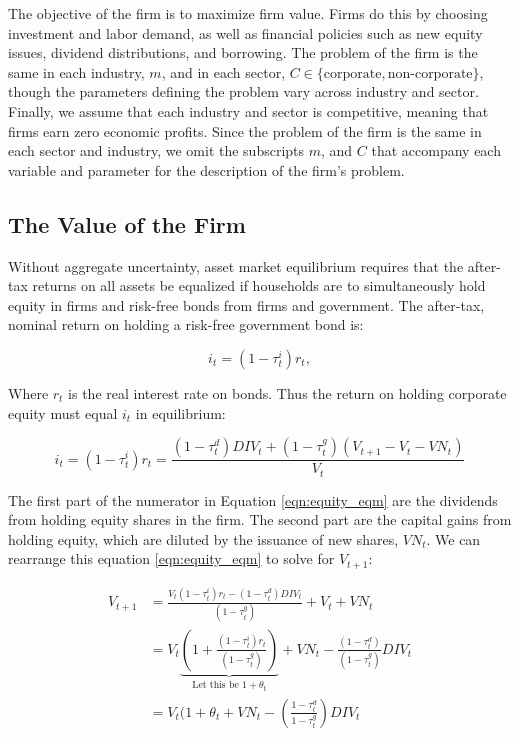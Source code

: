 The objective of the firm is to maximize firm value.  Firms do this by choosing investment and labor demand, as well as financial policies such as new equity issues, dividend distributions, and borrowing.  The problem of the firm is the same in each industry, $m$, and in each sector, $C\in\{\text{corporate},\text{non-corporate}\}$, though the parameters defining the problem vary across industry and sector.  Finally, we assume that each industry and sector is competitive, meaning that firms earn zero economic profits.  Since the problem of the firm is the same in each sector and industry, we omit the subscripts $m$, and $C$ that accompany each variable and parameter for the description of the firm's problem.

\subsection{The Value of the Firm}

Without aggregate uncertainty, asset market equilibrium requires that the after-tax returns on all assets be equalized if households are to simultaneously hold equity in firms and risk-free bonds from firms and government.  The after-tax, nominal return on holding a risk-free government bond is:

\begin{equation}
\label{eqn:r}
i_{t}=(1-\tau^{i}_{t})r_{t},
\end{equation}

\noindent\noindent Where $r_{t}$ is the real interest rate on bonds.  Thus the return on holding corporate equity must equal $i_{t}$ in equilibrium:

\begin{equation}
\label{eqn:equity_eqm}
i_{t}=(1-\tau^{i}_{t})r_{t}=\frac{(1-\tau^{d}_{t})DIV_{t}+(1-\tau^{g}_{t})(V_{t+1}-V_{t}-VN_{t})}{V_{t}}
\end{equation}

The first part of the numerator in Equation \ref{eqn:equity_eqm} are the dividends from holding equity shares in the firm.  The second part are the capital gains from holding equity, which are diluted by the issuance of new shares, $VN_{t}$.  We can rearrange this equation \ref{eqn:equity_eqm} to solve for $V_{t+1}$:

\begin{equation}
\label{eqn:v_t1}
\begin{split}
V_{t+1}&=\frac{V_{t}(1-\tau^{i}_{t})r_{t}-(1-\tau^{d}_{t})DIV_{t}}{(1-\tau^{g}_{t})}+V_{t}+VN_{t} \\
 & = V_{t}\underbrace{\left(1+\frac{(1-\tau^{i}_{t})r_{t}}{(1-\tau^{g}_{t})}\right)}_{\text{Let this be }1+\theta_{t}} + VN_{t} - \frac{(1-\tau^{d}_{t})}{(1-\tau^{g}_{t})}DIV_{t} \\
 & = V_{t}(1+\theta_{t} + VN_{t} - \left(\frac{1-\tau^{d}_{t}}{1-\tau^{g}_{t}}\right)DIV_{t}
\end{split}
\end{equation}


